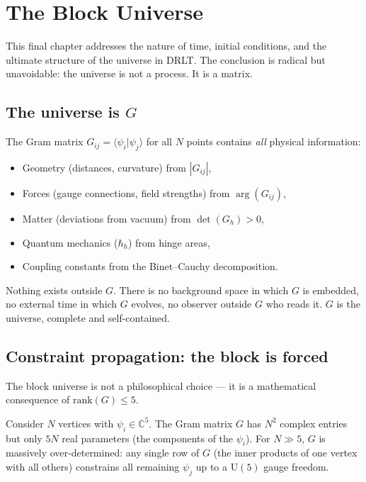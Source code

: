 \documentclass[12pt]{article}
\theoremstyle{remark}
\theoremstyle{definition}
\begin{document}

\section{The Block Universe}
\label{ch:block}

This final chapter addresses the nature of time, initial conditions, and the ultimate structure of the universe in DRLT. The conclusion is radical but unavoidable: the universe is not a process. It is a matrix.

\subsection{The universe is $G$}

The Gram matrix $G_{ij} = \langle\psi_i|\psi_j\rangle$ for all $N$ points contains \emph{all} physical information:
\begin{itemize}
\item Geometry (distances, curvature) from $|G_{ij}|$,
\item Forces (gauge connections, field strengths) from $\arg(G_{ij})$,
\item Matter (deviations from vacuum) from $\det(G_h) > 0$,
\item Quantum mechanics ($\hbar_h$) from hinge areas,
\item Coupling constants from the Binet--Cauchy decomposition.
\end{itemize}

Nothing exists outside $G$. There is no background space in which $G$ is embedded, no external time in which $G$ evolves, no observer outside $G$ who reads it. $G$ is the universe, complete and self-contained.

\subsection{Constraint propagation: the block is forced}

The block universe is not a philosophical choice --- it is a mathematical consequence of $\text{rank}(G) \leq 5$.

Consider $N$ vertices with $\psi_i \in \mathbb{C}^5$. The Gram matrix $G$ has $N^2$ complex entries but only $5N$ real parameters (the components of the $\psi_i$). For $N \gg 5$, $G$ is massively over-determined: any single row of $G$ (the inner products of one vertex with all others) constrains all remaining $\psi_j$ up to a $\text{U}(5)$ gauge freedom.
\end{document}
